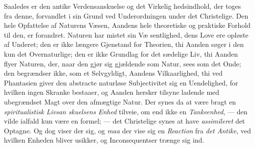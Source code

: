 Saaledes er den antike Verdensanskuelse og det Virkelig\-%
hedsindhold, der toges fra denne, forvandlet i sin Grund ved
Underordningen under det Christelige. Den hele Opfattelse
af Naturens Væsen, Aandens hele theoretiske og praktiske
Forhold til den, er forandret. Naturen har mistet sin Væ\-%
sentlighed, dens Love ere opløste af Underet; den er ikke
længere Gjenstand for Theorien, thi Aanden søger i den kun
det Overnaturlige; den er ikke Grundlag for det sædelige Liv,
thi Aanden flyer Naturen, der, naar den gjør sig gjældende
som Natur, sees som det Onde; den begrændser ikke, som et
Selvgyldigt, Aandens Vilkaarlighed, thi ved Phantasien giver
den abstracte naturløse Subjectivitet sig en Uendelighed, for
hvilken ingen Skranke bestaaer, og Aanden hersker tilsyne\-%
ladende med ubegrændset Magt over den afmægtige Natur.
Der synes da at være bragt en \emph{spiritualistisk Livsan\-%
skuelsens Enhed} tilveie, om end ikke en \emph{Tankeenhed}, ---
den vilde ialfald kun være en formel; --- det Christelige
 synes at have \emph{assimileret} det Optagne. Og dog viser der
sig, og \emph{maa} der vise sig en \emph{Reaction} fra \emph{det Antike},
ved hvilken Enheden bliver usikker, og Inconsequentser trænge
sig ind.

